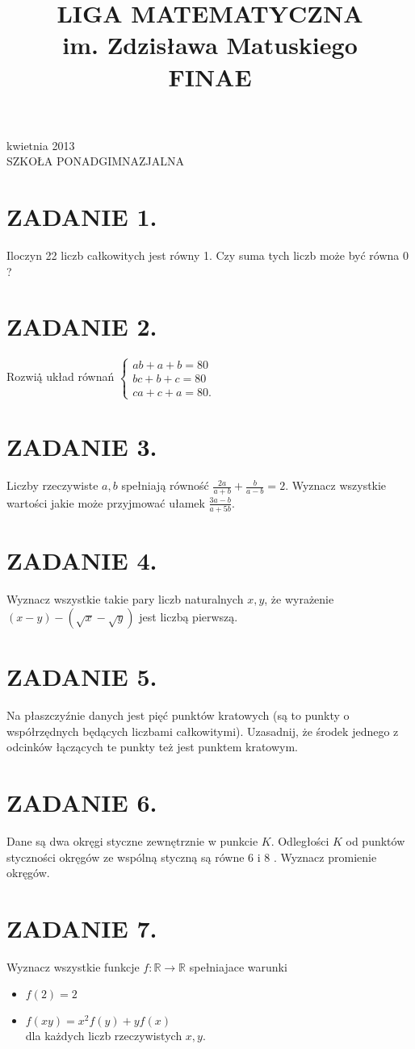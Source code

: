 \documentclass[10pt]{article}
\title{LIGA MATEMATYCZNA \\
 im. Zdzisława Matuskiego \\
 FINAE }
\author{}
\date{}
\begin{document}
 kwietnia 2013\\
SZKOŁA PONADGIMNAZJALNA

\section*{ZADANIE 1.}
Iloczyn 22 liczb całkowitych jest równy 1. Czy suma tych liczb może być równa 0 ?

\section*{ZADANIE 2.}
Rozwią̇̇ układ równań \(\left\{\begin{array}{l}a b+a+b=80 \\ b c+b+c=80 \\ c a+c+a=80 .\end{array}\right.\)

\section*{ZADANIE 3.}
Liczby rzeczywiste \(a, b\) spełniają równość \(\frac{2 a}{a+b}+\frac{b}{a-b}=2\). Wyznacz wszystkie wartości jakie może przyjmować ułamek \(\frac{3 a-b}{a+5 b}\).

\section*{ZADANIE 4.}
Wyznacz wszystkie takie pary liczb naturalnych \(x, y\), że wyrażenie \((x-y)-(\sqrt{x}-\sqrt{y})\) jest liczbą pierwszą.

\section*{ZADANIE 5.}
Na płaszczyźnie danych jest pięć punktów kratowych (są to punkty o współrzędnych będących liczbami całkowitymi). Uzasadnij, że środek jednego z odcinków łączących te punkty też jest punktem kratowym.

\section*{ZADANIE 6.}
Dane są dwa okręgi styczne zewnętrznie w punkcie \(K\). Odległości \(K\) od punktów styczności okręgów ze wspólną styczną są równe 6 i 8 . Wyznacz promienie okręgów.

\section*{ZADANIE 7.}
Wyznacz wszystkie funkcje \(f: \mathbb{R} \rightarrow \mathbb{R}\) spełniajace warunki

\begin{itemize}
  \item \(f(2)=2\)
  \item \(f(x y)=x^{2} f(y)+y f(x)\)\\
dla każdych liczb rzeczywistych \(x, y\).
\end{itemize}
\end{document}
